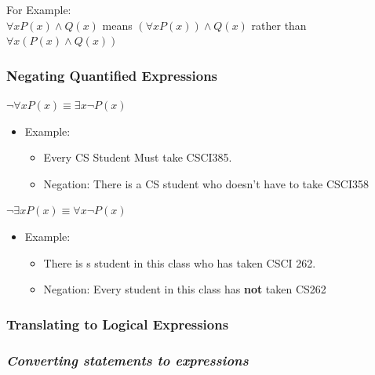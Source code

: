 \documentclass[12pt, letterpaper]{article}
\begin{document}
For Example: \\
\hspace*{1cm} $\forall x  P(x) \land Q(x)$ means $(\forall x  P(x)) \land Q(x)$ rather than $\forall x  (P(x) \land Q(x))$

\pagebreak

\subsubsection*{Negating Quantified Expressions}
\bigbreak
\bigbreak
\Large $\neg \forall x P(x) \equiv \exists x \neg P(x)$ 
\normalsize
\begin{itemize}[leftmargin=*, label={}]
	\item Example:
	\begin{itemize}
		\item Every CS Student Must take CSCI385.
		\item Negation: There is a CS student who doesn't have to take CSCI358
	\end{itemize}
\end{itemize}

\bigbreak
\bigbreak

\Large $\neg \exists x P(x) \equiv \forall x \neg P(x)$
\normalsize
\begin{itemize}[leftmargin=*, label={}]
	\item Example:
	\begin{itemize}
		\item There is s student in this class who has taken CSCI 262.
		\item Negation: Every student in this class has \textbf{not} taken CS262
	\end{itemize}
\end{itemize}




\pagebreak

\subsubsection{Translating to Logical Expressions}
\subsubsection*{\small \emph{Converting statements to expressions}}
\end{document}
